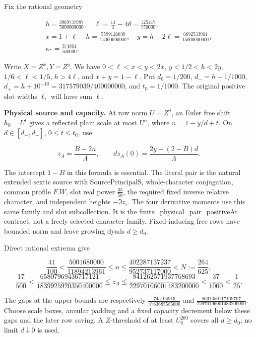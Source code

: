 \documentclass[11pt,a4paper]{article}
\begin{document}
Fix the rational geometry

\[
\begin{gathered}
h=\frac{3969737987}{5000000000},\quad
\ell=\frac{11}{3}-4\theta=\frac{125417}{750000},\\
x=1+\ell-h=\frac{5599126039}{15000000000},\quad
y=h-2\ell=\frac{6892533961}{15000000000},\\
\kappa_*=\frac{374861}{500000}.
\end{gathered}
\tag{3.1}
\]

Write \(X=Z^x,Y=Z^y\). We have \(0<\ell<x<y<2x\), \(y<1/2<h<2y\),
\(1/6<\ell<1/5\), \(h>4\ell\), and \(x+y=1-\ell\). Put \(d_0=1/200\),
\(d_-=h-1/1000\), \(d_+=h+10^{-10}=317579039/400000000\), and
\(t_0=1/1000\). The original positive slot widths \(\ell_i\) will have
sum \(\ell\).

\textbf{Physical source and capacity.} At row norm \(U=Z^d\), an Euler
free shift \(h_0=U^t\) gives a reflected plain scale at most \(U^{n}\),
where \(n=1-y/d+t\). On \(d\in[d_-,d_+]\), \(0\le t\le t_0\), use

\[
z_A=\frac{B-2n}{\Lambda},\qquad
d z_A(0)=\frac{2y-(2-B)d}{\Lambda}.
\tag{3.2}
\]

The intercept \(1-B\) in this formula is essential. The literal pair is
the natural extended sextic source with SourcePrincipalS,
whole-character conjugation, common profile \(\overline{F.W}\), slot
real power \(\frac{33}{50}\), the required fixed inverse relative character, and
independent heights \(-\Im z_i\). The four derivative moments use this
same family and slot subcollection. It is the
finite\_\allowbreak{}physical\_\allowbreak{}pair\_\allowbreak{}positiveAt contract, not a freely selected
character family. Fixed-inducing free rows have bounded norm and leave
growing dyads \(d\ge d_0\).

Direct rational extrema give

\[
\frac{41}{100}<\frac{5001680000}{11894213961}\le n
 \le\frac{402287137237}{952737117000}<N:=\frac{264}{625},
\] \[
\frac{17}{500}<\frac{65807969436717121}{1839925920350400000}
 \le z_A\le
\frac{841262571937768693}{22970106001483200000}
 <\frac{37}{1000}<\frac1{25}.
\tag{3.3}
\]

The gaps at the upper bounds are respectively
\(\frac{745104919}{4763685585000}\) and
\(\frac{8631350117109707}{22970106001483200000}\). Choose scale boxes, annular
padding and a fixed capacity decrement below these gaps and the later
row saving. A \(Z\)-threshold of at least \(U_0^{200}\) covers all
\(d\ge d_0\); no limit \(d\downarrow0\) is used.
\end{document}

